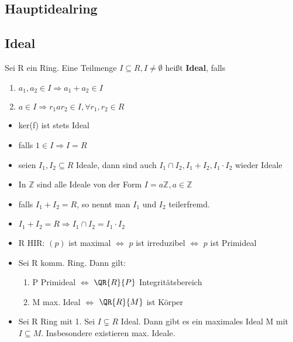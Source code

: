 \subsection{Hauptidealring}

\subsection{Ideal}
\begin{definition}
Sei R ein Ring. Eine Teilmenge $I \subseteq R, I \neq \emptyset$ heißt \textbf{Ideal}, falls
\begin{enumerate}
	\item $a_1,a_2 \in I \Rightarrow a_1+a_2 \in I$
	\item $a \in I \Rightarrow r_1 a r_2 \in I, \forall r_1,r_2 \in R$
\end{enumerate}
\end{definition}

\begin{remark}
\leavevmode
\begin{itemize}
	\item ker(f) ist stets Ideal
	\item falls $1 \in I \Rightarrow I = R$
	\item seien $I_1,I_2 \subseteq R$ Ideale, dann sind auch $I_1 \cap I_2, I_1+I_2, I_1 \cdot I_2$ wieder Ideale
	\item In $\mathbb{Z}$ sind alle Ideale von der Form $I=a\mathbb{Z}, a \in \mathbb{Z}$
	\item falls $I_1+I_2 = R$, so nennt man $I_1$ und $I_2$ teilerfremd.
	\item $I_1+I_2 = R \Rightarrow I_1 \cap I_2 = I_1 \cdot I_2$
	\item R HIR: $(p)$ ist maximal $ \Leftrightarrow $ $p$ ist irreduzibel $\Leftrightarrow$ $p$ ist Primideal
	\item Sei R komm. Ring. Dann gilt:
	\begin{enumerate}
		\item P Primideal $\Leftrightarrow$ $\QR{R}{P}$ Integritätsbereich
		\item M max. Ideal $\Leftrightarrow$ $\QR{R}{M}$ ist Körper
	\end{enumerate}
	\item Sei R Ring mit 1. Sei $I \subsetneq R $ Ideal. Dann gibt es ein maximales Ideal M mit $ I \subseteq M$. Insbesondere existieren max. Ideale.
\end{itemize}
\end{remark}

